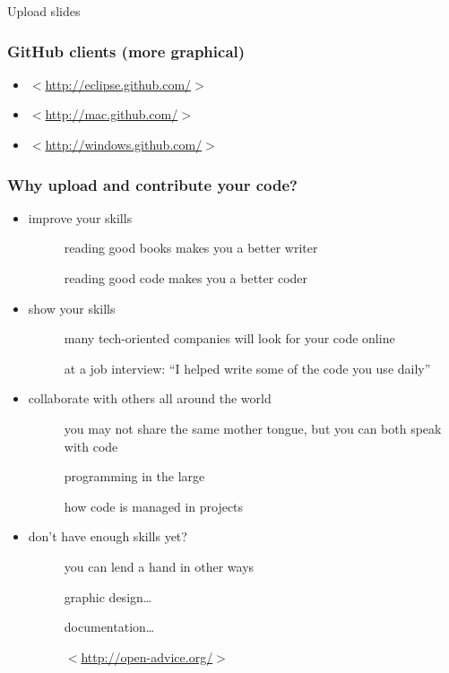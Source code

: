\documentclass[%
        hyperref={%
                pdfauthor={Zakariyya Mughal},%
                pdfpagemode={None},pdfpagelayout={SinglePage}}%
        xcolor={x11names},%
]{beamer}
\begin{document}
\begin{frame}
\begin{center}
	\Huge Upload slides
\end{center}
\end{frame}

\begin{frame}
\frametitle{GitHub clients (more graphical)}
\begin{itemize}
	\item[] $<$\href{http://eclipse.github.com/}{http://eclipse.github.com/}$>$
	\item[] $<$\href{http://mac.github.com/}{http://mac.github.com/}$>$
	\item[] $<$\href{http://windows.github.com/}{http://windows.github.com/}$>$
\end{itemize}
\end{frame}

\begin{frame}[allowframebreaks]
	\frametitle{Why upload and contribute your code?}
		\begin{itemize}
		\item[] improve your skills
			\begin{description}
				\item[] reading good books makes you a better writer
				\item[] reading good code makes you a better coder
			\end{description}
		\item[] show your skills
			\begin{description}
				\item[] many tech-oriented companies will look for your code online
				\item[] 
				\item[] at a job interview: ``I
					helped write some of the
					code you use daily''
			\end{description}
		\framebreak
		\item[] collaborate with others all around the world
			\begin{description}
				\item[] you may not share the same mother tongue, but you can both speak with code
				\item[] programming in the large
				\item[] \qquad how code is managed in projects
			\end{description}
		\item[] don't have enough skills yet?
			\begin{description}
				\item[] you can lend a hand in other ways
				\item[] \qquad graphic design\ldots
				\item[] \qquad documentation\ldots
				\item[] $<$\href{http://open-advice.org/}{http://open-advice.org/}$>$
			\end{description}
		\end{itemize}
\end{frame}
\end{document}
